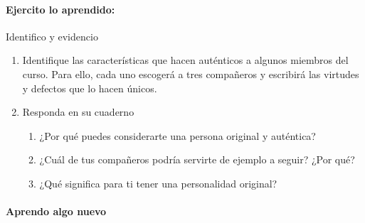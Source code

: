 \documentclass[10pt,twoside]{article}
\begin{document}
\paragraph*{Ejercito lo aprendido:} Identifico y evidencio
\begin{enumerate}
\item Identifique las características que hacen auténticos a
algunos miembros del curso. Para ello, cada uno escogerá a tres compañeros y escribirá las virtudes y defectos que lo hacen únicos.
\item Responda en su cuaderno
\begin{enumerate}
\item ¿Por qué puedes considerarte una persona original y
auténtica?
\item ¿Cuál de tus compañeros podría servirte de ejemplo a
seguir? ¿Por qué?
\item ¿Qué significa para ti tener una personalidad
original?
\end{enumerate}
\end{enumerate}
\paragraph*{Aprendo algo nuevo}
\end{document}
